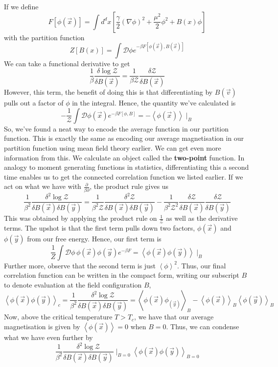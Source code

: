 If we define 
\[
	F[ \phi ( \vec{x} ) ] = \int d^{  d} x \left[ \frac{\gamma}{2 } ( \nabla \phi)^ 2 + \frac{\mu^2 }{2 } \phi^2 + B ( x) \phi  \right] 
\] with the partition function 
\[
	Z [ B ( x) ] = \int \mathcal{ D } \phi e^{  - \beta  F [ \phi ( \vec{x} ), B ( \vec{x} ) ]}
\] We can take a functional derivative to get
\[
	\frac{1}{\beta } \frac{\delta \log \mathcal{ Z }}{\delta B ( \vec{x} ) } = \frac{1}{\beta \mathcal{ Z }} \frac{ \delta \mathcal{ Z }}{ \delta B ( \vec{x} ) }
\] However, this term, the benefit of doing this is that differentiating by $B ( \vec{v} ) $ pulls out a factor of $ \phi $ in the integral. Hence, the quantity we've calculated is 
\[
	- \frac{1}{\mathcal{ Z } } \int \mathcal{ D } \phi ( \vec{x})  e^{  - \beta F[ \phi , B  ] } =  - \left< \phi ( \vec{x} )  \right> \mid_{ B }
\] So, we've found a neat way to encode the average function in our partition function. 
This is exactly the same as encoding our average magnetisation 
in our partition function using mean field theory earlier. 
We can get even more information from this. We calculate an object called the \textbf{two-point} function. 
In analogy to moment generating functions in statistics, 
differentiating this a second time enables us to get the connected 
correlation function we listed earlier. If we act on what we have 
with $  \frac{ \partial  }{ \beta \partial  }$, the product rule gives us 
\[
	\frac{1}{ \beta ^ 2 } \frac{\delta^ 2   \log \mathcal{  Z} }{\delta B ( \vec{x} ) \delta B ( \vec{y} ) } = \frac{1}{ \beta ^ 2 \mathcal{ Z } } \frac{ \delta ^2 \mathcal{ Z } }{\delta B ( \vec{x} ) \delta B ( \vec{y} ) }  - \frac{1}{ \beta ^ 2 \mathcal{Z } ^ 2 } \frac{ \delta \mathcal{ Z } }{ \delta B ( \vec{x} ) } \frac{ \delta \mathcal{ Z } }{ \delta B ( \vec{y}) } 
\] This was obtained by applying the product rule on $ \frac{1}{ \mathcal{ Z } } $ as 
well as the derivative terms. 
The upshot is that the first term pulls down two factors, $ \phi ( \vec{x} )  $ and $ \phi ( \vec{y} ) $ from our free energy. 
Hence, our first term is 
\[
	 \frac{1}{ Z }\int \mathcal{ D } \phi \, \phi ( \vec{x} ) \phi ( \vec{y} ) e^{  - \beta F } = \left< \phi ( \vec{x} ) \phi ( \vec{y} )  \right>\mid_B
\]  Further more, observe that the second term is just 
$ \left< \phi  \right>^ 2 $. 
Thus, our final correlation function can be written in the compact form, writing our subscript $ B $ to denote evaluation at the field configuration $ B $, 
\[
	\left< \phi ( \vec{x} ) \phi ( \vec{y} )  \right>_c  = \frac{1}{\beta ^ 2 } \frac{ \delta ^ 2 \log \mathcal{ Z } }{\delta B ( \vec{x} ) \delta B ( \vec{y} ) } = \left< \phi ( \vec{x} ) \phi_( \vec{y} )  \right>_B - \left<\phi( \vec{x} ) \right>_B \left< \phi( \vec{y} )  \right>_B 
\] Now, above the critical temperature $ T > T_{  c} $, we have that our average 
magnetisation is given by $ \left< \phi ( \vec{x} )  \right>  = 0 $ when $B = 0$. 
Thus, we can condense what we have even further by 
 \[
	 \frac{1}{ \beta ^ 2 } \frac{ \delta ^ 2 \log \mathcal{ Z }  }{\delta B ( \vec{x} )  \delta B ( \vec{y} ) }\mid_{ B  =0 } \left< \phi ( \vec{x} )\phi ( \vec{y} )   \right>_{ B = 0} 
\] 


